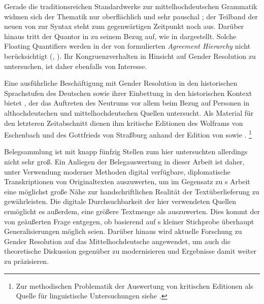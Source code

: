 Gerade die traditionsreichen Standard\-werke zur
mittelhochdeutschen Grammatik widmen sich der Thematik
nur oberflächlich und sehr pauschal \autocites(dazu
)[siehe][384]{paul2007}[188]{dal2014}; der
Teilband der neuen 
von \citeauthor*{ksw2} zur Syntax steht zum gegenwärtigen Zeitpunkt noch aus.
Darüber hinaus tritt der Quantor  in  zu
seinem Bezug auf, wie in  dargestellt. Solche Floating
Quantifiers \autocite{sportiche1988} werden in der von
\citet[204]{corbett1979} formulierten \textit{Agreement Hierarchy} nicht
berücksichtigt (, ). Ihr
Kongruenzverhalten in Hinsicht auf Gender Resolution zu untersuchen, ist daher
ebenfalls von Interesse.

Eine ausführliche Beschäftigung mit Gender Resolution in den
historischen Sprachstufen des Deutschen sowie ihrer Einbettung
in den historischen Kontext bietet \citet{askedal1973}, der das
Auftreten des Neutrums vor allem beim Bezug auf Personen in
althochdeutschen und
mittelhochdeutschen Quellen untersucht. Als Material für
den letzteren Zeitabschnitt dienen ihm kritische
Editionen des  Wolframs von
Eschenbach und des  Gottfrieds von
Straßburg anhand der Edition von
\citet{lachmannhartl1952} sowie \citet{maroldschroeder1969}.%
%
	\footnote{Zur methodischen Problematik der Auswertung von kritischen
		Editionen als Quelle für linguistische
		Untersuchungen siehe .}

 Belegsammlung ist mit knapp fünfzig Stellen zum hier
untersuchten  allerdings nicht sehr groß. Ein Anliegen der
Belegauswertung in dieser Arbeit ist daher, unter Verwendung moderner Methoden
digital verfügbare, diplomatische Transkriptionen von Originaltexten
auszuwerten, um im Gegensatz zu \citeauthor{askedal1973}s Arbeit eine möglichst
große Nähe zur handschriftlichen Realität der Textüberlieferung zu
gewährleisten. Die digitale Durchsuchbarkeit der hier verwendeten Quellen
ermöglicht es außerdem, eine größere Textmenge als \citeauthor{askedal1973}
auszuwerten. Dies kommt der von \citet[118]{fleischerschallert2011} geäußerten
Frage entgegen, ob basierend auf \citeauthor{askedal1973}s kleiner Stichprobe
überhaupt Generalisierungen möglich seien. Darüber hinaus wird aktu\-elle
Forschung zu Gender Resolution auf das Mittelhochdeutsche
angewendet, um auch die theoretische Diskussion gegenüber \citet{askedal1973}
zu modernisieren und Ergebnisse damit weiter zu präzisieren.

